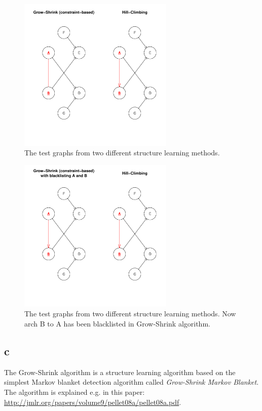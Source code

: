 \documentclass[a4paper,english]{article}
\begin{document}
\begin{figure}[htp]
    \begin{center}
        \includegraphics[width=0.66\textwidth]{graphs.pdf}
        \caption{The test graphs from two different structure learning methods.} \label{fig:graph}
    \end{center}
\end{figure}

\begin{figure}[htp]
    \begin{center}
        \includegraphics[width=0.66\textwidth]{graphs2.pdf}
        \caption{The test graphs from two different structure learning methods. Now arch B to A has been blacklisted in Grow-Shrink algorithm.} \label{fig:graph2}
    \end{center}
\end{figure}

\subsection*{c}
The Grow-Shrink algorithm is a structure learning algorithm based on the simplest Markov blanket detection algorithm called \emph{Grow-Shrink Markov Blanket}. The algorithm is explained e.g. in this paper: \url{http://jmlr.org/papers/volume9/pellet08a/pellet08a.pdf}.
\end{document}
